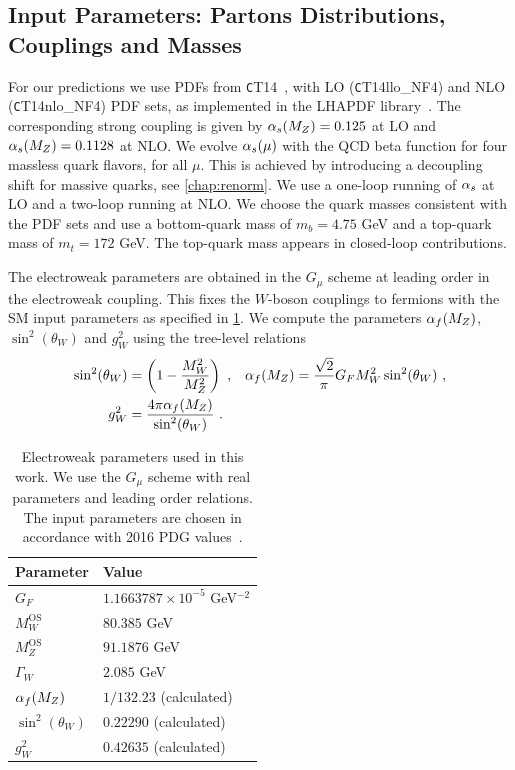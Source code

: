 \subsection{Input Parameters: Partons Distributions, Couplings and Masses}
\label{sec:base_setup}
For our predictions we use PDFs from {\texttt CT14}~\cite{CT14},
with LO ({\texttt CT14llo\_NF4}) and NLO ({\texttt CT14nlo\_NF4}) PDF sets, as
implemented in the LHAPDF library~\cite{LHAPDF}. The corresponding strong
coupling is given by $\alpha_s(M_Z)=0.125$ at LO and
$\alpha_s(M_Z)=0.1128$ at NLO. We evolve $\alpha_s(\mu)$ with
the QCD beta function for four massless quark flavors, for all $\mu$. This is
achieved by introducing a decoupling shift for massive quarks, see \cref{chap:renorm}. We
use a one-loop running of $\alpha_s$ at LO and a two-loop running at NLO. We
choose the quark masses consistent with the PDF sets and use a bottom-quark mass of $m_b=4.75$ GeV and a top-quark mass of $m_t=172$ GeV. The top-quark
mass appears in closed-loop contributions.


The electroweak parameters are obtained in the $G_\mu$
scheme \cite{Denner2000c} at leading order in the electroweak coupling. This fixes the
$W$-boson couplings to fermions with the SM input
parameters as specified in \cref{tab:ewinput}. We compute the parameters $\alpha_f(M_Z)$,
$\sin^2(\theta_W)$ and $g_W^2$ using the tree-level relations
\begin{align}\label{eq:ewlorel}
\sin^2(\theta_W) &= \left(1-\frac{M_W^2}{M_Z^2}\right)\ , & \alpha_f(M_Z)&=\frac{\sqrt{2}}{\pi}G_F M_W^2
  \sin^2(\theta_W)\ ,\notag\\
g_W^2&=\frac{4\pi\alpha_f(M_Z) }{\sin^2(\theta_W)}\ .
\end{align}

\begin{table}[]
  \centering
  \begin{tabular}{p{3.5cm}p{5cm}}
    \toprule
    Parameter & Value  \\
    \midrule
    $G_F$ & $1.1663787 \times 10^{-5}$ GeV$^{-2}$ \\
    $M_W^{\text{OS}}$& $80.385$ GeV \\
    $M_Z^{\text{OS}}$& $91.1876$ GeV \\
    $\Gamma_W$& $2.085$ GeV \\
    $\alpha_f(M_Z)$ & $1/132.23$ (calculated)\\
    $\sin^2(\theta_W)$ & $0.22290$ (calculated)\\
    $g_W^2$ & $0.42635$ (calculated)\\
    \bottomrule
  \end{tabular}
  \caption{Electroweak parameters used in this work. We use the $G_\mu$
    scheme with real parameters and leading order relations. The input parameters
    are chosen in accordance with 2016 PDG
    values~\cite{Patrignani:2016xqp}.}
    \label{tab:ewinput}
  \end{table}

